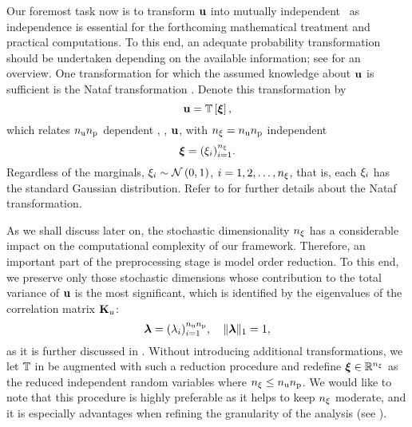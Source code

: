 Our foremost task now is to transform $\mathbf{u}$ into mutually independent \rvs\ as independence is essential for the forthcoming mathematical treatment and practical computations.
To this end, an adequate probability transformation should be undertaken depending on the available information; see \cite{eldred2008} for an overview.
One transformation for which the assumed knowledge about $\mathbf{u}$ is sufficient is the Nataf transformation \cite{li2008}.
Denote this transformation by
\begin{equation} \elab{probability-transformation}
  \vu = \transformation{\vz},
\end{equation}
which relates ${n_\text{u}} {n_\text{p}}$ dependent \rvs, \ie, $\mathbf{u}$, with ${n_\xi} = {n_\text{u}} {n_\text{p}}$ independent \rvs
\begin{equation} \elab{independent-random-variables}
  \vz = (\z_i)_{i = 1}^\nvars.
\end{equation}
Regardless of the marginals, $\xi_i \sim \mathcal{N}\left( 0, 1 \right)$, $i = 1, 2, \dots, {n_\xi}$, that is, each $\xi_i$ has the standard Gaussian distribution.
Refer to  for further details about the Nataf transformation.

As we shall discuss later on, the stochastic dimensionality ${n_\xi}$ has a considerable impact on the computational complexity of our framework.
Therefore, an important part of the preprocessing stage is model order reduction.
To this end, we preserve only those stochastic dimensions whose contribution to the total variance of $\mathbf{u}$ is the most significant, which is identified by the eigenvalues of the correlation matrix $\mathbf{K}_u$:
\begin{equation} \elab{dimension-contribution}
  \dimensionContribution = (\lambda_i)_{i = 1}^{\nparams \nprocs}, \hspace{1em} \norm[1]{\dimensionContribution} = 1,
\end{equation}
as it is further discussed in .
Without introducing additional transformations, we let $\transformation$ in  be augmented with such a reduction procedure and redefine $\bm{\xi} \in \mathbb{R}^{n_\xi}$ as the reduced independent random variables where ${n_\xi} \leq {n_\text{u}} {n_\text{p}}$.
We would like to note that this procedure is highly preferable as it helps to keep ${n_\xi}$ moderate, and it is especially advantages when refining the granularity of the analysis (see ).

